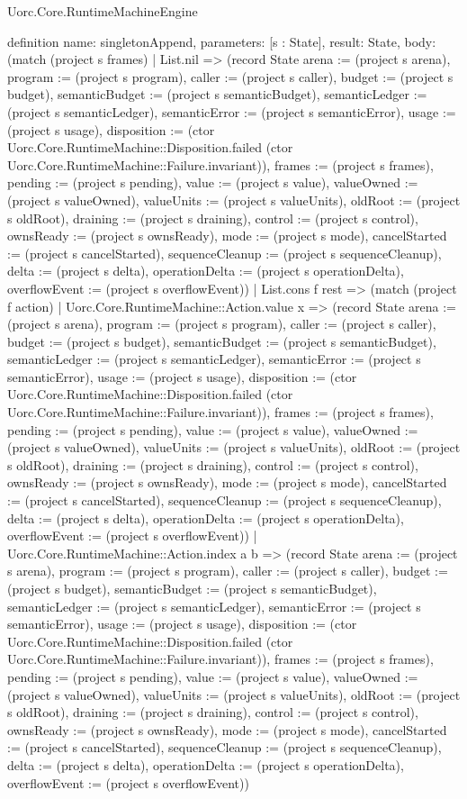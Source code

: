 \begin{lexlean}{Uorc.Core.RuntimeMachineEngine}
\begin{semanticmodule}
definition{
  name: singletonAppend,
  parameters: [s : State],
  result: State,
  body: (match (project s frames)
    | List.nil => (record State {arena := (project s arena), program := (project s program), caller := (project s caller), budget := (project s budget), semanticBudget := (project s semanticBudget), semanticLedger := (project s semanticLedger), semanticError := (project s semanticError), usage := (project s usage), disposition := (ctor Uorc.Core.RuntimeMachine::Disposition.failed (ctor Uorc.Core.RuntimeMachine::Failure.invariant)), frames := (project s frames), pending := (project s pending), value := (project s value), valueOwned := (project s valueOwned), valueUnits := (project s valueUnits), oldRoot := (project s oldRoot), draining := (project s draining), control := (project s control), ownsReady := (project s ownsReady), mode := (project s mode), cancelStarted := (project s cancelStarted), sequenceCleanup := (project s sequenceCleanup), delta := (project s delta), operationDelta := (project s operationDelta), overflowEvent := (project s overflowEvent)})
    | List.cons f rest => (match (project f action)
      | Uorc.Core.RuntimeMachine::Action.value x => (record State {arena := (project s arena), program := (project s program), caller := (project s caller), budget := (project s budget), semanticBudget := (project s semanticBudget), semanticLedger := (project s semanticLedger), semanticError := (project s semanticError), usage := (project s usage), disposition := (ctor Uorc.Core.RuntimeMachine::Disposition.failed (ctor Uorc.Core.RuntimeMachine::Failure.invariant)), frames := (project s frames), pending := (project s pending), value := (project s value), valueOwned := (project s valueOwned), valueUnits := (project s valueUnits), oldRoot := (project s oldRoot), draining := (project s draining), control := (project s control), ownsReady := (project s ownsReady), mode := (project s mode), cancelStarted := (project s cancelStarted), sequenceCleanup := (project s sequenceCleanup), delta := (project s delta), operationDelta := (project s operationDelta), overflowEvent := (project s overflowEvent)})
      | Uorc.Core.RuntimeMachine::Action.index a b => (record State {arena := (project s arena), program := (project s program), caller := (project s caller), budget := (project s budget), semanticBudget := (project s semanticBudget), semanticLedger := (project s semanticLedger), semanticError := (project s semanticError), usage := (project s usage), disposition := (ctor Uorc.Core.RuntimeMachine::Disposition.failed (ctor Uorc.Core.RuntimeMachine::Failure.invariant)), frames := (project s frames), pending := (project s pending), value := (project s value), valueOwned := (project s valueOwned), valueUnits := (project s valueUnits), oldRoot := (project s oldRoot), draining := (project s draining), control := (project s control), ownsReady := (project s ownsReady), mode := (project s mode), cancelStarted := (project s cancelStarted), sequenceCleanup := (project s sequenceCleanup), delta := (project s delta), operationDelta := (project s operationDelta), overflowEvent := (project s overflowEvent)})
}
\end{semanticmodule}
\end{lexlean}
